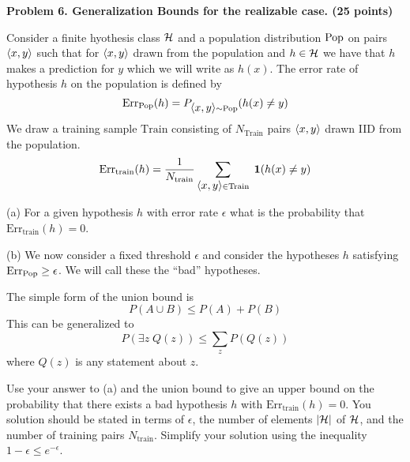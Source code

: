 \documentclass{article}
\newcommand{\solution}[1]{}
\begin{document}
\solution{
  Consider any $\Phi \in R^d$ for which the training loss is zero.  The projection $\Phi_\pi$ must also have zero training loss because
  each training vector can be written as a linear combination of basis vectors and $\Phi$ and $\Phi_\pi$ have the same inner product with each basis vector.
  Therefore $\Phi_\pi = \Phi^*$.  Futhermore $\Phi = \Phi_\pi + \Phi_\bot$ and
  $$||\Phi||^2 = ||\Phi_\pi||^2 + ||\Phi_\bot||^2 = ||\Phi^*||^2 + ||\Phi_\bot||^2$$
  which gives that $||\Phi|| \geq ||\Phi^*||$ as desired.
}


\bigskip
{\bf Problem 6. Generalization Bounds for the realizable case. (25 points)}

Consider a finite hyothesis class ${\cal H}$ and a population distribution $\mathrm{Pop}$ on pairs ${\mbox{$\langle x,y\rangle$}}$ such that for ${\mbox{$\langle x,y\rangle$}}$ drawn from the
population and $h \in {\cal H}$ we have that $h$ makes a prediction for $y$ which we will write as $h(x)$.  The error rate of hypothesis $h$ on the population is defined by
$$\mathrm{Err}_{\mathrm{Pop}}(h) = P_{{\mbox{$\langle x,y\rangle$}} \sim \mathrm{Pop}}(h(x) \not = y)$$
We draw a training sample $\mathrm{Train}$ consisting of $N_{\mathrm{Train}}$ pairs ${\mbox{$\langle x,y\rangle$}}$ drawn IID from the population.
$$\mathrm{Err}_{\mathrm{train}}(h) = \frac{1}{N_{\mathrm{train}}} \sum_{{\mbox{$\langle x,y\rangle$}} \in \mathrm{Train}}\;\mathbf{1}(h(x) \not = y)$$

\medskip
(a) For a given hypothesis $h$ with error rate $\epsilon$ what is the probability that $\mathrm{Err}_{\mathrm{train}}(h) = 0$.

\solution{
  $(1-\epsilon)^{N_{\mathrm{train}}}$
}

\medskip
(b) We now consider a fixed threshold $\epsilon$ and consider the hypotheses $h$ satisfying $\mathrm{Err}_{\mathrm{Pop}} \geq \epsilon$.
We will call these the ``bad'' hypotheses. 

\medskip
The simple form of the union bound is
$$P(A \cup B) \leq P(A) + P(B)$$
This can be generalized to
$$P(\exists z\; Q(z)) \leq \sum_z P(Q(z))$$
where $Q(z)$ is any statement about $z$.  

\medskip
Use your answer to (a) and the union bound to give an upper bound on the probability that 
there exists a bad hypothesis $h$ with $\mathrm{Err}_{\mathrm{train}}(h) = 0$.
You solution should be stated in terms of $\epsilon$, the number of elements $|{\cal H}|$ of ${\cal H}$,
and the number of training pairs $N_{\mathrm{train}}$.
Simplify your solution using the inequality $1-\epsilon \leq e^{-\epsilon}$.

\solution{
  \begin{eqnarray*}
    & & P(\exists h\; \;\mathrm{Err}_{\pop} \geq \epsilon,\; \mathrm{Err}_{\mathrm{train}}(h) = 0) \\
    \\
    & \leq & \sum_{h:\;\mathrm{Err}_{\pop}(h) \geq \epsilon}\;P(\mathrm{Err}_{\mathrm{train}}(h) = 0) \\
    \\
    & \leq & |{\cal H}| (1-\epsilon)^{N_{\mathrm{train}}} \\
    \\
    & \leq & |{\cal H}| e^{-N_{\mathrm{train}}\epsilon} \\
  \end{eqnarray*}
}
\end{document}
